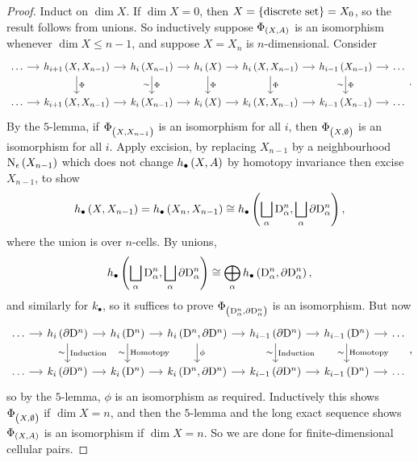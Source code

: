 \begin{proof}
Induct on $ \dim X $. If $ \dim X = 0 $, then $ X = \cbr{\text{discrete set}} = X_0 $, so the result follows from unions. So inductively suppose $ \Phi_{\br{X, A}} $ is an isomorphism whenever $ \dim X \le n - 1 $, and suppose $ X = X_n $ is $ n $-dimensional. Consider
$$
\begin{tikzcd}[column sep=small]
\dots \arrow{r} & h_{i + 1}\br{X, X_{n - 1}} \arrow{r} \arrow{d}{\Phi} & h_i\br{X_{n - 1}} \arrow{r} \arrow{d}{\Phi}[swap]{\sim} & h_i\br{X} \arrow{r} \arrow{d}{\Phi} & h_i\br{X, X_{n - 1}} \arrow{r} \arrow{d}{\Phi} & h_{i - 1}\br{X_{n - 1}} \arrow{r} \arrow{d}{\Phi}[swap]{\sim} & \dots \\
\dots \arrow{r} & k_{i + 1}\br{X, X_{n - 1}} \arrow{r} & k_i\br{X_{n - 1}} \arrow{r} & k_i\br{X} \arrow{r} & k_i\br{X, X_{n - 1}} \arrow{r} & k_{i - 1}\br{X_{n - 1}} \arrow{r} & \dots
\end{tikzcd}.
$$
By the $ 5 $-lemma, if $ \Phi_{\br{X, X_{n - 1}}} $ is an isomorphism for all $ i $, then $ \Phi_{\br{X, \emptyset}} $ is an isomorphism for all $ i $. Apply excision, by replacing $ X_{n - 1} $ by a neighbourhood $ \N_\epsilon\br{X_{n - 1}} $ which does not change $ h_\bullet\br{X, A} $ by homotopy invariance then excise $ X_{n - 1} $, to show
$$ h_\bullet\br{X, X_{n - 1}} = h_\bullet\br{X_n, X_{n - 1}} \cong h_\bullet\br{\bigsqcup_\alpha \D_\alpha^n, \bigsqcup_\alpha \da\D_\alpha^n}, $$
where the union is over $ n $-cells. By unions,
$$ h_\bullet\br{\bigsqcup_\alpha \D_\alpha^n, \bigsqcup_\alpha \da\D_\alpha^n} \cong \bigoplus_\alpha h_\bullet\br{\D_\alpha^n, \da\D_\alpha^n}, $$
and similarly for $ k_\bullet $, so it suffices to prove $ \Phi_{\br{\D_\alpha^n, \da\D_\alpha^n}} $ is an isomorphism. But now
$$
\begin{tikzcd}[column sep=small]
\dots \arrow{r} & h_i\br{\da\D^n} \arrow{r} \arrow{d}{\text{Induction}}[swap]{\sim} & h_i\br{\D^n} \arrow{r} \arrow{d}{\text{Homotopy}}[swap]{\sim} & h_i\br{\D^n, \da\D^n} \arrow{r} \arrow{d}{\phi} & h_{i - 1}\br{\da\D^n} \arrow{r} \arrow{d}{\text{Induction}}[swap]{\sim} & h_{i - 1}\br{\D^n} \arrow{r} \arrow{d}{\text{Homotopy}}[swap]{\sim} & \dots \\
\dots \arrow{r} & k_i\br{\da\D^n} \arrow{r} & k_i\br{\D^n} \arrow{r} & k_i\br{\D^n, \da\D^n} \arrow{r} & k_{i - 1}\br{\da\D^n} \arrow{r} & k_{i - 1}\br{\D^n} \arrow{r} & \dots
\end{tikzcd},
$$
so by the $ 5 $-lemma, $ \phi $ is an isomorphism as required. Inductively this shows $ \Phi_{\br{X, \emptyset}} $ if $ \dim X = n $, and then the $ 5 $-lemma and the long exact sequence shows $ \Phi_{\br{X, A}} $ is an isomorphism if $ \dim X = n $. So we are done for finite-dimensional cellular pairs.
\end{proof}

